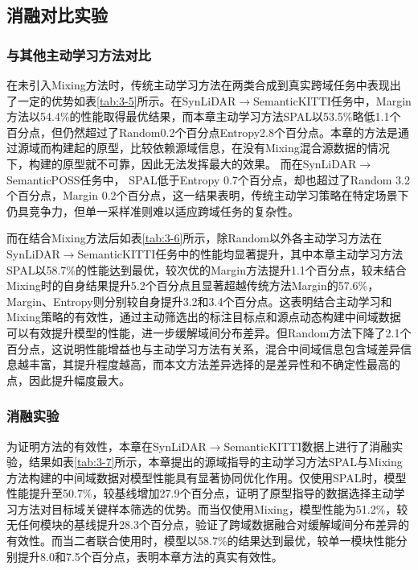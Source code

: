 \subsection{消融对比实验}
\subsubsection{与其他主动学习方法对比}
在未引入Mixing方法时，传统主动学习方法在两类合成到真实跨域任务中表现出了一定的优势如表\ref{tab:3-5}所示。在SynLiDAR$\to$SemanticKITTI任务中，Margin方法以54.4\%的性能取得最优结果，而本章主动学习方法SPAL以53.5\%略低1.1个百分点，但仍然超过了Random0.2个百分点Entropy2.8个百分点。本章的方法是通过源域而构建起的原型，比较依赖源域信息，在没有Mixing混合源数据的情况下，构建的原型就不可靠，因此无法发挥最大的效果。
而在SynLiDAR$\to$SemanticPOSS任务中，
SPAL低于Entropy 0.7个百分点，却也超过了Random 3.2个百分点，Margin 0.2个百分点，这一结果表明，传统主动学习策略在特定场景下仍具竞争力，但单一采样准则难以适应跨域任务的复杂性。

\vspace{0.1cm}


而在结合Mixing方法后如表\ref{tab:3-6}所示，除Random以外各主动学习方法在SynLiDAR$\to$SemanticKITTI任务中的性能均显著提升，其中本章主动学习方法SPAL以58.7\%的性能达到最优，较次优的Margin方法提升1.1个百分点，较未结合Mixing时的自身结果提升5.2个百分点且显著超越传统方法Margin的57.6\%，Margin、Entropy则分别较自身提升3.2和3.4个百分点。这表明结合主动学习和Mixing策略的有效性，通过主动筛选出的标注目标点和源点动态构建中间域数据可以有效提升模型的性能，进一步缓解域间分布差异。但Random方法下降了2.1个百分点，这说明性能增益也与主动学习方法有关系，混合中间域信息包含域差异信息越丰富，其提升程度越高，而本文方法差异选择的是差异性和不确定性最高的点，因此提升幅度最大。
\vspace{0.1cm}


\subsubsection{消融实验}
为证明方法的有效性，本章在SynLiDAR$\to$SemanticKITTI数据上进行了消融实验，结果如表\ref{tab:3-7}所示，本章提出的源域指导的主动学习方法SPAL与Mixing方法构建的中间域数据对模型性能具有显著协同优化作用。仅使用SPAL时，模型性能提升至50.7\%，较基线增加27.9个百分点，证明了原型指导的数据选择主动学习方法对目标域关键样本筛选的优势。而当仅使用Mixing，模型性能为51.2\%，较无任何模块的基线提升28.3个百分点，验证了跨域数据融合对缓解域间分布差异的有效性。而当二者联合使用时，模型以58.7\%的结果达到最优，较单一模块性能分别提升8.0和7.5个百分点，表明本章方法的真实有效性。
\vspace{0.1cm}


